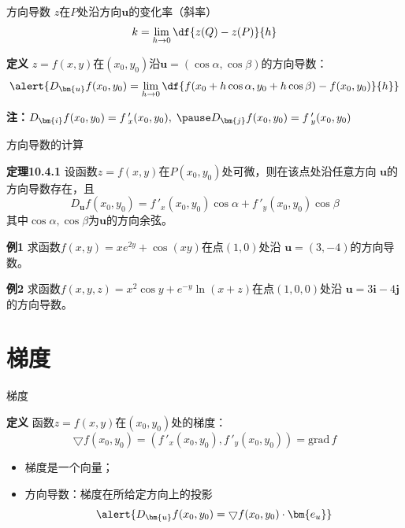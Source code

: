 \begin{frame}{方向导数}
	\linespread{1.2}
	$z$在$P$处沿方向$\bm{u}$的变化率（斜率）\pause 
	$$k=\lim\limits_{h\to 0}\df{z(Q)-z(P)}{h}$$
	\vspace{-1em}\pause 
	\begin{block}{{\bf 定义}\hfill}
		{\bb $z=f(x,y)$在$(x_0,y_0)$沿$\bm{u}=(\cos\alpha,\cos\beta)$的方向导数：}\pause 
		$$\alert{D_{\bm{u}}f(x_0,y_0)=\lim\limits_{h\to 0}
		\df{f(x_0+h\cos\alpha,y_0+h\cos\beta)-f(x_0,y_0)}{h}}$$
	\end{block}\pause 
	{\bf 注：}$D_{\bm{i}}f(x_0,y_0)=f\,'_x(x_0,y_0),\;\pause 
	D_{\bm{j}}f(x_0,y_0)=f\,'_y(x_0,y_0)$
\end{frame}

\begin{frame}{方向导数的计算}
	\linespread{1.2}\pause 
	\begin{block}{{\bf 定理10.4.1}\hfill}
		设函数$z=f(x,y)$在$P(x_0,y_0)$处可微，\pause 则在该点处沿任意方向
		$\bm{u}$的方向导数存在，\pause 且
		$$D_{\bm{u}}f(x_0,y_0) =f\,'_x(x_0,y_0)\cos\alpha+f\,'_y(x_0,y_0)\cos\beta$$
		其中$\cos\alpha,\cos\beta$为$\bm{u}$的方向余弦。
	\end{block}
\end{frame}

\begin{frame}
	\linespread{1.2}
	\begin{exampleblock}{{\bf 例1}\hfill}
		求函数$f(x,y)=xe^{2y}+\cos(xy)$在点$(1,0)$处沿
		$\bm{u}=(3,-4)$的方向导数。
	\end{exampleblock}
	\bigskip\pause 
	\begin{exampleblock}{{\bf 例2}\hfill}
		求函数$f(x,y,z)=x^2\cos y+e^{-y}\ln(x+z)$在点$(1,0,0)$处沿
		$\bm{u}=3\bm{i}-4\bm{j}$的方向导数。
	\end{exampleblock}
\end{frame}

\section{梯度}

\begin{frame}{梯度}
	\linespread{1.2}\pause 
	\begin{block}{{\bf 定义}\hfill}
		{\bb 函数$z=f(x,y)$在$(x_0,y_0)$处的梯度：}
		$$\bigtriangledown
		f(x_0,y_0)=(f\,'_x(x_0,y_0),f\,'_y(x_0,y_0))=\bm{\mathrm{grad}}\,f$$
		\end{block}\pause
	\begin{itemize}
	  \item 梯度是一个向量；\pause 
	  \item 方向导数：梯度在所给定方向上的投影\pause 
	  $$\alert{D_{\bm{u}}f(x_0,y_0)=\bigtriangledown f(x_0,y_0)\cdot\bm{e_u}}$$
	\end{itemize}
\end{frame}

